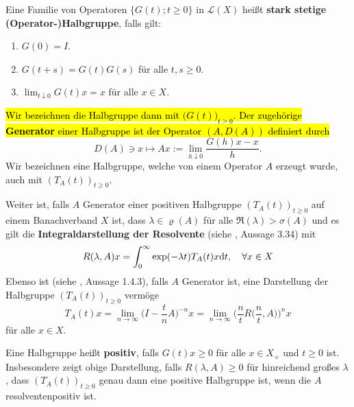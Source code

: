 \par
Eine Familie von Operatoren $\{G(t); t\geq0\}$ in $\mathcal L(X)$  heißt \textbf{stark stetige (Operator-)Halbgruppe}, falls gilt:
\begin{enumerate}
\item $G(0)=I$.
\item $G(t+s)=G(t)G(s)$ für alle $t,s\geq0$.
\item $\lim_{t\downarrow 0}G(t)x=x$ für alle $x\in X$.
\end{enumerate}
\hl{Wir bezeichnen die Halbgruppe dann mit  $\big(G(t)\big)_{t\geq0}$. Der zugehörige \textbf{Generator} einer Halbgruppe ist der Operator $(A, D(A))$ definiert durch} \begin{equation*}
D(A)\ni x\mapsto Ax:=\lim_{h\downarrow 0}\frac{G(h)x - x}{h}.
\end{equation*}
Wir bezeichnen eine Halbgruppe, welche von einem Operator $A$ erzeugt wurde, auch mit $(T_A(t))_{t\geq0}$. 

\par
Weiter ist, falls $A$ Generator einer positiven Halbgruppe $(T_A(t))_{t\geq0}$ auf einem Banachverband $X$ ist, dass $\lambda\in\varrho(A)$ für alle $\mathfrak R(\lambda)> \sigma(A)$ und es gilt die \textbf{Integraldarstellung der Resolvente} (siehe \cite{banasiak_arlotti_2006}, Aussage 3.34) mit
\begin{equation*}\label{eq:}
R(\lambda, A)x=\int_0^\infty \exp(-\lambda t)T_A(t)x\textnormal dt,\quad \forall x\in X
\end{equation*}
Ebenso ist (siehe \cite{pazy_1983}, Aussage 1.4.3), falls $A$ Generator ist,  eine Darstellung der Halbgruppe $(T_A(t))_{t\geq0}$ vermöge
\begin{equation*}\label{Darstellung der Gruppe mithilfe der Resolvente}
T_A(t)x = \lim_{n\to\infty}\Big(I- \frac t n A\Big)^{-n}x = \lim_{n\to\infty} \Big(\frac n t R\Big(\frac n t, A\Big)\Big)^n x
\end{equation*}
für alle $x\in X$.

\par
Eine Halbgruppe heißt \textbf{positiv}, falls  $G(t)x\geq0$ für alle $x\in X_+$ und $t\geq0$ ist. Insbesondere zeigt obige Darstellung, falls $R(\lambda, A)\geq0$ für hinreichend großes $\lambda$, dass $(T_A(t))_{t\geq0}$ genau dann eine positive Halbgruppe ist, wenn die $A$ resolventenpositiv ist.

